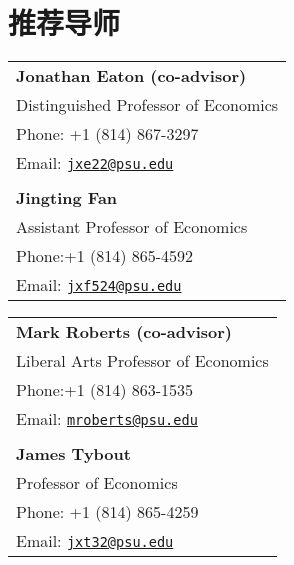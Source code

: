 \documentclass[letterpaper]{article}
\begin{document}

\section*{\textsc{推荐导师}}
\begin{minipage}{0.5\linewidth}
    \begin{tabular}{l}
        \textbf{Jonathan Eaton (co-advisor)}  \\
         Distinguished Professor of Economics \\
         Phone: +1 (814) 867-3297 \\
         Email: \href{mailto:jxe22@psu.edu}{\tt jxe22@psu.edu}\\
           \\
         \textbf{Jingting Fan}\\
         Assistant Professor of Economics  \\
         Phone:+1 (814) 865-4592 \\
         Email: \href{mailto:jxf524@psu.edu}{\tt jxf524@psu.edu}
    \end{tabular}
\end{minipage}
\begin{minipage}{0.5\linewidth}
    \begin{tabular}{l}
   \textbf{Mark Roberts (co-advisor)} \\
     Liberal Arts Professor of Economics\\
 Phone:+1 (814) 863-1535 \\
 Email: \href{mailto:mroberts@psu.edu}{\tt mroberts@psu.edu}  \\
\\
   \textbf{James Tybout}  \\
Professor of Economics     \\
Phone: +1 (814) 865-4259  \\
Email: \href{mailto:jxt32@psu.edu}{\tt jxt32@psu.edu}
    \end{tabular}
\end{minipage}
\end{document}

